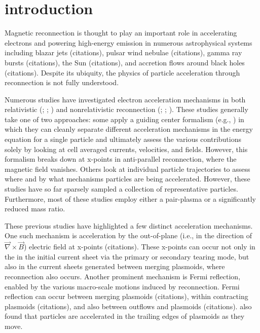 \documentclass[iop,twocolappendix]{emulateapj}
\begin{document}
\section{introduction} \label{introduction}
Magnetic reconnection is thought to play an important role in accelerating electrons and powering high-energy emission in numerous astrophysical systems including blazar jets (citations), pulsar wind nebulae (citations), gamma ray bursts (citations), the Sun (citations), and accretion flows around black holes (citations).  Despite its ubiquity, the physics of particle acceleration through reconnection is not fully understood.  

Numerous studies have investigated electron acceleration mechanisms in both relativistic (\citealt{nalewajko2015}; \citealt{guo2015}; \citealt{werner2017}) and nonrelativistic reconnection (\citealt{dahlin2014}; \citealt{li_guo_2017}; \citealt{wangh2016}).  These studies generally take one of two approaches: some apply a guiding center formalism (e.g., \citealt{dahlin2014}) in which they can cleanly separate different acceleration mechanisms in the energy equation for a single particle and ultimately assess the various contributions solely by looking at cell averaged currents, velocities,  and fields. However, this formalism breaks down at x-points in anti-parallel reconnection, where the magnetic field vanishes.  Others look at individual particle trajectories to assess where and by what mechanisms particles are being accelerated.  However, these studies have so far sparsely sampled a collection of representative particles.  Furthermore, most of these studies employ either a pair-plasma or a significantly reduced mass ratio. 

These previous studies have highlighted a few distinct acceleration mechanisms.  One such mechanism is acceleration by the out-of-plane (i.e., in the direction of $\vec{\nabla} \times \vec{B}$) electric field at x-points (citations).  These x-points can occur not only in the in the initial current sheet via the primary or secondary tearing mode, but also in the current sheets generated between merging plasmoids, where reconnection also occurs.  Another prominent mechanism is Fermi reflection, enabled by the various macro-scale motions induced by reconnection.  Fermi reflection can occur between merging plasmoids (citations), within contracting plasmoids (citations), and also between outflows and plasmoids (citations).  \citet{nalewajko2015} also found that particles are accelerated in the trailing edges of plasmoids as they move.
\end{document}
